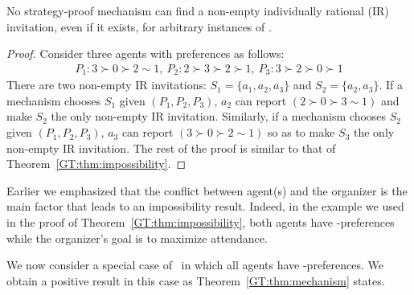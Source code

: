 \begin{theorem} \label{GT:thm:impossibility_IR}
	No strategy-proof mechanism can find a non-empty individually rational (IR) invitation, even if it exists, for arbitrary instances of \ASIP. 
\end{theorem}
\begin{proof}
Consider three agents with preferences as follows:
\begin{equation*}
	\begin{aligned}
			P_1: 3\succ 0 \succ 2 \sim 1,~ P_2: 2 \succ 3 \succ 2 \succ 1, ~ P_3: 3 \succ 2 \succ 0 \succ 1
	\end{aligned}
\end{equation*}
There are two non-empty IR invitations: $S_1 = \{a_1, a_2, a_3\}$ and $S_2 = \{a_2, a_3\}$. 
If a mechanism chooses $S_1$ given $(P_1, P_2, P_3)$, $a_2$ can report $(2 \succ 0 \succ 3 \sim 1)$ and make $S_2$ the only non-empty IR invitation. Similarly, if a mechanism chooses $S_2$ given $(P_1, P_2, P_3)$, $a_3$ can report $(3 \succ 0 \succ 2 \sim 1)$ so as to make $S_3$ the only non-empty IR invitation. The rest of the proof is similar to that of Theorem~\ref{GT:thm:impossibility}.
\end{proof}


Earlier we emphasized that the conflict between agent(s) and the organizer is the main factor that leads to an impossibility result. 
Indeed, in the example we used in the proof of Theorem~\ref{GT:thm:impossibility}, both agents have \DEC-preferences while the organizer's goal is to maximize attendance.

We now consider a special case of \ASIP\ in which all agents have \INC-preferences.
We obtain a positive result in this case as Theorem~\ref{GT:thm:mechanism} states. 

